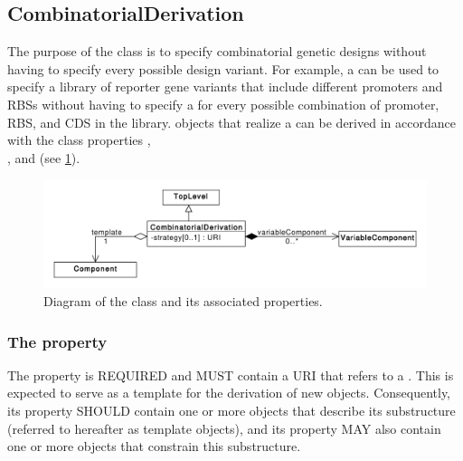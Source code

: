 \subsection{CombinatorialDerivation}
\label{sec:CombinatorialDerivation}

The purpose of the  class is to specify combinatorial genetic designs without having to specify every possible design variant. For example, a  can be used to specify a library of reporter gene variants that include different promoters and RBSs without having to specify a  for every possible combination of promoter, RBS, and CDS in the library.  objects that realize a  can be derived in accordance with the class properties , \\
, and  (see \ref{uml:combinatorial_derivation}).

\begin{figure}[ht]
\begin{center}
\includegraphics[scale=0.6]{uml/combinatorial_derivation}
\caption[]{Diagram of the  class and its associated properties.}
\label{uml:combinatorial_derivation}
\end{center}
\end{figure}

\subsubsection*{ The  property}\label{sec:template}

The  property is REQUIRED and MUST contain a URI that refers to a . 
This  is expected to serve as a template for the derivation of new  objects. 
Consequently, its  property SHOULD contain one or more  objects that describe its substructure (referred to hereafter as template  objects), and its  property MAY also contain one or more  objects that constrain this substructure.

